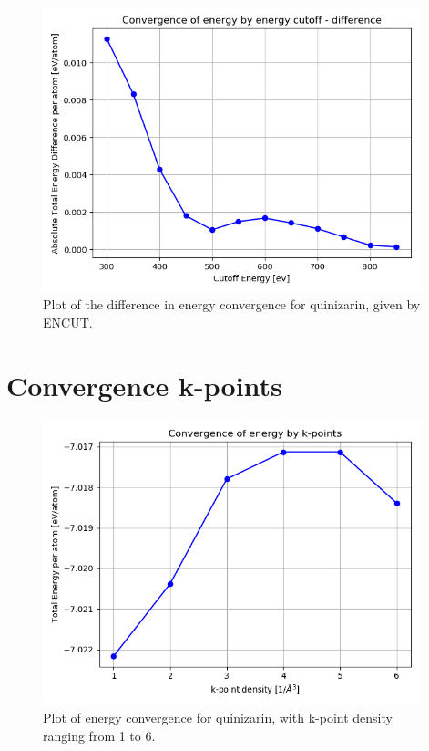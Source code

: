 \documentclass{article}
\begin{document}
  \begin{figure}[H]
      \centering
      \includegraphics[width = 11cm]{../fig/convergence_energy_difference.png}
      \caption{Plot of the difference in energy convergence for quinizarin, given by ENCUT. }
      \label{fig:convergence_energy_difference.png}
  \end{figure}

\vspace{1cm}

\section{Convergence k-points}

  \begin{figure}[H]
      \centering
      \includegraphics[width = 11cm]{../fig/convergence_kpoints.png}
      \caption{Plot of energy convergence for quinizarin, with k-point density ranging from 1 to 6. }
      \label{fig:convergence_kpoints.png}
  \end{figure}
\end{document}
